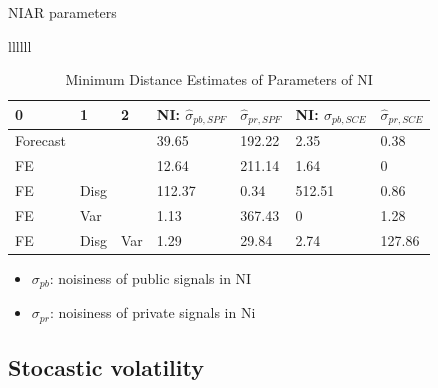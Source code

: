 \documentclass{beamer}
\begin{document}
\begin{frame}{NIAR parameters}
	\begin{table}
		\centering
		\caption{Minimum Distance Estimates of Parameters of NI}
		\label{GMM_Est_NI_Table}
		\begin{tabular}{llllll}
	\begin{tabular}{lllllll}
		\hline 
		0        & 1    & 2   & NI: $\hat\sigma_{pb,SPF}$ & $\hat\sigma_{pr,SPF}$ & NI: $\hat\sigma_{pb,SCE}$ & $\hat\sigma_{pr,SCE}$ \\
		\hline 
		Forecast &      &     & 39.65                     & 192.22                & 2.35                      & 0.38                  \\
		FE       &      &     & 12.64                     & 211.14                & 1.64                      & 0                     \\
		FE       & Disg &     & 112.37                    & 0.34                  & 512.51                    & 0.86                  \\
		FE       & Var  &     & 1.13                      & 367.43                & 0                         & 1.28                  \\
		FE       & Disg & Var & 1.29                      & 29.84                 & 2.74                      & 127.86                \\
		\hline 
	\end{tabular}  
		\end{tabular}
	\end{table}	
\begin{itemize}
	\item $\sigma_{pb}$: noisiness of public signals in NI
	\item $\sigma_{pr}$: noisiness of private signals in Ni 
\end{itemize}
\end{frame}

\subsection{Stocastic volatility}
\end{document}

